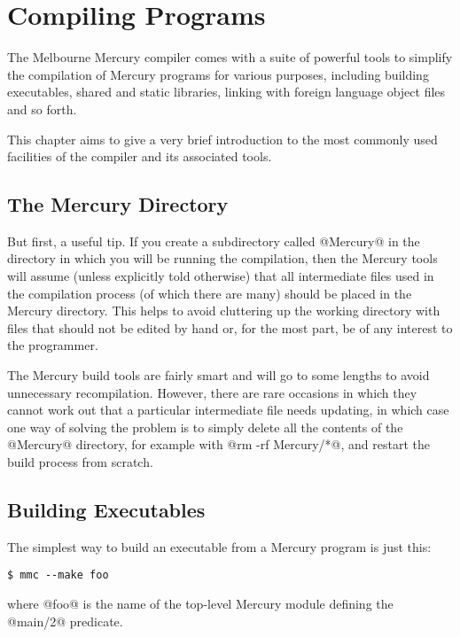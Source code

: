 
\chapter{Compiling Programs}

The Melbourne Mercury compiler comes with a suite of powerful tools to
simplify the compilation of Mercury programs for various purposes,
including building executables, shared and static libraries, linking
with foreign language object files and so forth.

This chapter aims to give a very brief introduction to the most
commonly used facilities of the compiler and its associated tools.

\section{The Mercury Directory}

But first, a useful tip.  If you create a subdirectory called @Mercury@
in the directory in which you will be running the compilation, then the
Mercury tools will assume (unless explicitly told otherwise) that all
intermediate files used in the compilation process (of which there are
many) should be placed in the Mercury directory.  This helps to avoid
cluttering up the working directory with files that should not be edited
by hand or, for the most part, be of any interest to the programmer.

The Mercury build tools are fairly smart and will go to some lengths to
avoid unnecessary recompilation.  However, there are rare occasions in
which they cannot work out that a particular intermediate file needs
updating, in which case one way of solving the problem is to simply
delete all the contents of the @Mercury@ directory, for example with 
@rm -rf Mercury/*@, and restart the build process from scratch.

\section{Building Executables}


The simplest way to build an executable from a Mercury program is just
this:
\begin{verbatim}
$ mmc --make foo
\end{verbatim}
where @foo@ is the name of the top-level Mercury module defining the
@main/2@ predicate.


